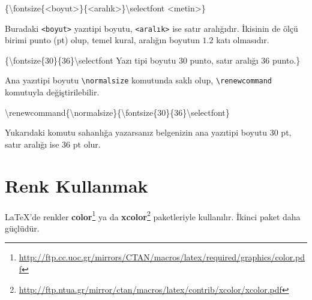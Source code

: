\documentclass[
  10pt,
]{scrbook}
\newenvironment{Shaded}{}{}
\newcommand{\ExtensionTok}[1]{#1}
\newcommand{\FunctionTok}[1]{\textcolor[rgb]{0.02,0.16,0.49}{#1}}
\newcommand{\NormalTok}[1]{#1}
\renewcommand{\href}[2]{#2\footnote{\url{#1}}}
\theoremstyle{definition}
\theoremstyle{definition}
\theoremstyle{definition}
\theoremstyle{definition}
\theoremstyle{remark}
\begin{document}
\begin{Shaded}
\begin{Highlighting}[]
\NormalTok{\{}\FunctionTok{\textbackslash{}fontsize}\NormalTok{\{\textless{}boyut\textgreater{}\}\{\textless{}aralık\textgreater{}\}}\FunctionTok{\textbackslash{}selectfont}\NormalTok{ \textless{}metin\textgreater{}\}}
\end{Highlighting}
\end{Shaded}

Buradaki \texttt{\textless{}boyut\textgreater{}} yazıtipi boyutu, \texttt{\textless{}aralık\textgreater{}} ise satır aralığıdır. İkisinin de ölçü birimi punto (pt) olup, temel kural, aralığın boyutun \(1.2\) katı olmasıdır.

\begin{Shaded}
\begin{Highlighting}[]
\NormalTok{\{}\FunctionTok{\textbackslash{}fontsize}\NormalTok{\{30\}\{36\}}\FunctionTok{\textbackslash{}selectfont}
\NormalTok{Yazı tipi boyutu 30 punto,}
\NormalTok{satır aralığı 36 punto.\}}
\end{Highlighting}
\end{Shaded}

Ana yazıtipi boyutu \texttt{\textbackslash{}normalsize} komutunda saklı olup, \texttt{\textbackslash{}renewcommand} komutuyla değiştirilebilir.

\begin{Shaded}
\begin{Highlighting}[]
\FunctionTok{\textbackslash{}renewcommand}\NormalTok{\{}\ExtensionTok{\textbackslash{}normalsize}\NormalTok{\}\{}\FunctionTok{\textbackslash{}fontsize}\NormalTok{\{30\}\{36\}}\FunctionTok{\textbackslash{}selectfont}\NormalTok{\}}
\end{Highlighting}
\end{Shaded}

Yukarıdaki komutu sahanlığa yazarsanız belgenizin ana yazıtipi boyutu 30 pt, satır aralığı ise 36 pt olur.

\hypertarget{renk-kullanmak}{%
\section{Renk Kullanmak}\label{renk-kullanmak}}

LaTeX'de renkler \href{http://ftp.cc.uoc.gr/mirrors/CTAN/macros/latex/required/graphics/color.pdf}{\textbf{color}} ya da \href{http://ftp.ntua.gr/mirror/ctan/macros/latex/contrib/xcolor/xcolor.pdf}{\textbf{xcolor}} paketleriyle kullanılır. İkinci paket daha güçlüdür.
\end{document}
